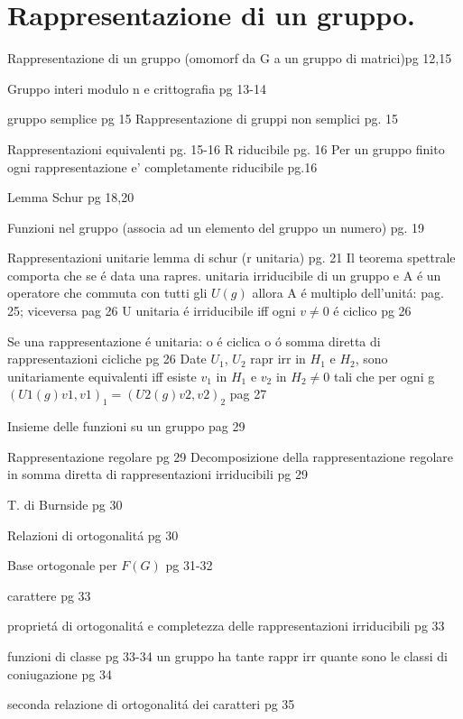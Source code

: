 \documentclass[oneside,12pt]{memoir}
\begin{document}
\section{Rappresentazione di un gruppo.}

\begin{itemize*}
\item Rappresentazione di un gruppo (omomorf da G a un gruppo di matrici)pg 12,15
\item Gruppo  interi modulo n e crittografia pg 13-14
\item gruppo semplice pg 15
Rappresentazione di gruppi non semplici pg. 15
\item Rappresentazioni equivalenti pg. 15-16
R riducibile pg. 16
Per un gruppo finito ogni rappresentazione e' completamente riducibile pg.16
\item Lemma Schur pg 18,20
\item Funzioni nel gruppo (associa ad un elemento del gruppo un numero) pg. 19
\item Rappresentazioni unitarie lemma di schur (r unitaria) pg. 21
Il teorema spettrale comporta che se \'e data una rapres. unitaria irriducibile di un gruppo e A  \'e un operatore che commuta con tutti gli $U(g)$ allora A \'e multiplo dell'unit\'a: pag. 25; viceversa pag 26
U unitaria \'e irriducibile iff ogni $v\neq0$ \'e ciclico pg 26
\item Se una rappresentazione \'e unitaria: o \'e ciclica o \'o somma diretta di rappresentazioni cicliche pg 26
Date $U_1$, $U_2$ rapr irr in $H_1$ e $H_2$, sono unitariamente equivalenti iff esiste $v_1$ in $H_1$ e $v_2$ in $H_2 \neq0$ tali che per ogni g $(U1(g)v1,v1)_1=(U2(g)v2,v2)_2$ pag 27
\item Insieme delle funzioni su un gruppo pag 29
\item Rappresentazione regolare pg 29
Decomposizione della rappresentazione regolare in somma diretta di rappresentazioni irriducibili pg 29
\item T. di Burnside pg 30
\item Relazioni di ortogonalit\'a pg 30
\item Base ortogonale per $F(G)$ pg 31-32
\item carattere pg 33
\item propriet\'a di ortogonalit\'a e completezza delle rappresentazioni irriducibili pg 33
\item funzioni di classe pg 33-34
un gruppo ha tante rappr irr quante sono le classi di coniugazione pg 34
\item seconda relazione di ortogonalit\'a dei caratteri pg 35

\end{itemize*}
\end{document}
